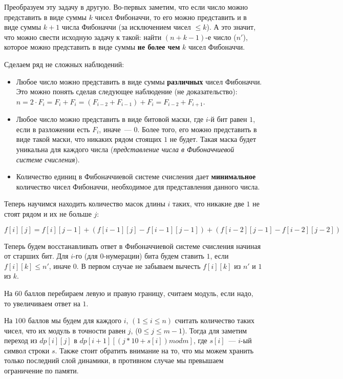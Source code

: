 \documentclass[12pt]{article}
\begin{document}

Преобразуем эту задачу в другую. Во-первых заметим, что если число можно представить в виде суммы $k$ чисел Фибоначчи, то его можно представить и
в виде суммы $k+1$ числа Фибоначчи (за исключением чисел $\le k$). А это значит, что можно свести исходную задачу к такой: найти $(n+k-1)$-е число ($n'$),
которое можно представить в виде суммы \textbf{не более чем} $k$ чисел Фибоначчи.

Сделаем ряд не сложных наблюдений:
\begin{itemize}
	\item 
	Любое число можно представить в виде суммы \textbf{различных} чисел Фибоначчи.
	Это можно понять сделав следующее наблюдение (не доказательство):
	$n = 2 \cdot F_i = F_i + F_i = (F_{i-2} + F_{i-1}) + F_i = F_{i-2} + F_{i+1}$.
	\item
	Любое число можно представить в виде битовой маски, где $i$-й бит равен $1$, если в разложении есть $F_i$, иначе~--- $0$.
	Более того, его можно представить в виде такой маски, что никаких рядом стоящих $1$ не будет. Такая маска будет уникальна
	для каждого числа (\textit{представление числа в Фибоначчиевой системе счисления}).
	\item
	Количество единиц в Фибоначчиевой системе счисления дает \textbf{минимальное} количество чисел Фибоначчи, необходимое для представления
	данного числа.
\end{itemize}

Теперь научимся находить количество масок длины $i$ таких, что никакие две $1$ не стоят рядом и их не больше $j$:

$f[i][j] = f[i][j - 1] + (f[i - 1][j] - f[i - 1][j - 1]) + (f[i - 2][j - 1] - f[i - 2][j - 2])$

Теперь будем восстанавливать ответ в Фибоначчиевой системе счисления начиная от старших бит. Для $i$-го (для 0-нумерации) бита будем ставить $1$, если
$f[i][k] \le n'$, иначе $0$. В первом случае не забываем вычесть $f[i][k]$ из $n'$ и $1$ из $k$.

\EndEditorial


На $60$ баллов перебираем левую и правую границу, считаем модуль, если надо, то увеличиваем ответ на $1$.

На $100$ баллов мы будем для каждого $i$, $(1 \le i \le n)$ считать количество таких чисел, что их модуль в точности равен $j$, ($0 \le j \le m - 1$).
Тогда для заметим переход из $dp[i][j]$ в $dp[i + 1][(j * 10 + s[i]) mod m]$, где $s[i]$~--- $i$-ый символ строки $s$.
Также стоит обратить внимание на то, что мы можем хранить только последний слой динамики, в противном случае мы превышаем ограничение по памяти.
\end{document}
